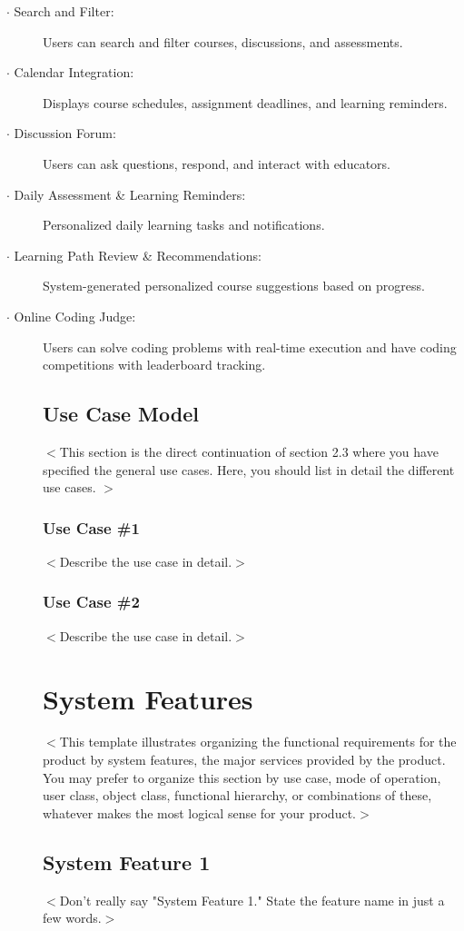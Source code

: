\documentclass[a4paper, 11pt]{scrreprt}
\begin{document}
\begin{description}
\begin{enumerate}
        \end{enumerate}
    \item[$\cdot$ Search and Filter:] Users can search and filter courses, discussions, and assessments.
    \item[$\cdot$ Calendar Integration:] Displays course schedules, assignment deadlines, and learning reminders.
    \item[$\cdot$ Discussion Forum:] Users can ask questions, respond, and interact with educators.
    \item[$\cdot$ Daily Assessment & Learning Reminders:] Personalized daily learning tasks and notifications.
    \item[$\cdot$ Learning Path Review & Recommendations:] System-generated personalized course suggestions based on progress.
    \item[$\cdot$ Online Coding Judge:] Users can solve coding problems with real-time execution and have coding competitions with leaderboard tracking.

\section{Use Case Model}
$<$This section is the direct continuation of section 2.3 where you have specified 
the general use cases. Here, you should list in detail the different use cases. 
$>$
\subsection{Use Case \#1}
$<$Describe the use case in detail.$>$

\subsection{Use Case \#2}
$<$Describe the use case in detail.$>$



\chapter{System Features}
$<$This template illustrates organizing the functional requirements for the 
product by system features, the major services provided by the product. You may 
prefer to organize this section by use case, mode of operation, user class, 
object class, functional hierarchy, or combinations of these, whatever makes the 
most logical sense for your product.$>$

\section{System Feature 1}
$<$Don't really say "System Feature 1." State the feature name in just a few 
words.$>$


\end{description}
\end{document}
